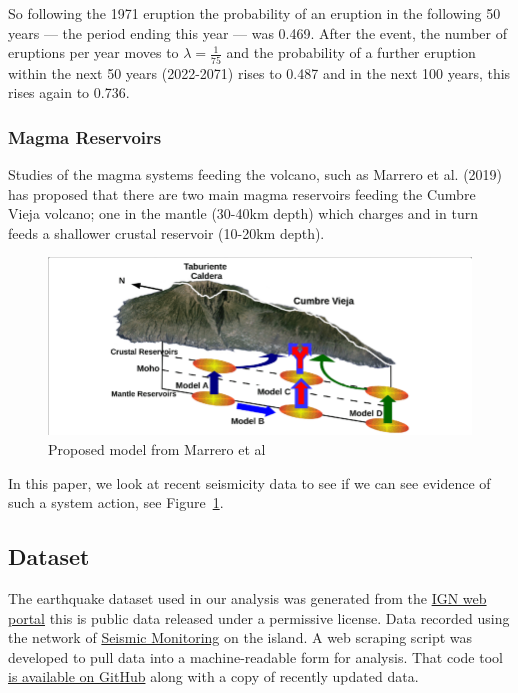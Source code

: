 \documentclass[
]{agujournal2019}
\begin{document}
So following the 1971 eruption the probability of an eruption in the
following 50 years --- the period ending this year --- was 0.469. After
the event, the number of eruptions per year moves to
\(\lambda=\frac{1}{75}\) and the probability of a further eruption
within the next 50 years (2022-2071) rises to 0.487 and in the next 100
years, this rises again to 0.736.

\subsubsection{Magma Reservoirs}\label{magma-reservoirs}

Studies of the magma systems feeding the volcano, such as Marrero et al.
(2019) has proposed that there are two main magma reservoirs feeding the
Cumbre Vieja volcano; one in the mantle (30-40km depth) which charges
and in turn feeds a shallower crustal reservoir (10-20km depth).

\begin{figure}

{\centering \includegraphics[width=1\textwidth,height=\textheight]{images/reservoirs.png}

}

\caption{\label{fig-reservoirs}Proposed model from Marrero et al}

\end{figure}

In this paper, we look at recent seismicity data to see if we can see
evidence of such a system action, see Figure~\ref{fig-reservoirs}.

\subsection{Dataset}\label{dataset}

The earthquake dataset used in our analysis was generated from the
\href{https://www.ign.es/web/resources/volcanologia/tproximos/canarias.html}{IGN
web portal} this is public data released under a permissive license.
Data recorded using the network of
\href{notebooks/seismic-monitoring-stations.qmd}{Seismic Monitoring} on
the island. A web scraping script was developed to pull data into a
machine-readable form for analysis. That code tool
\href{https://github.com/stevejpurves/ign-earthquake-data}{is available
on GitHub} along with a copy of recently updated data.
\end{document}
